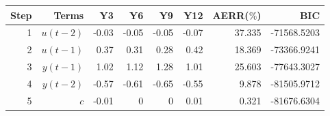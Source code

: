 \begin{tabular}{rrrrrrrr}
Step & Terms & Y3 & Y6 & Y9 & Y12 & AERR($\%$) & BIC \\ 
\hline 
1 & $u(t-2)$ & -0.03 & -0.05 & -0.05 & -0.07 & 37.335 & -71568.5203 \\ 
2 & $u(t-1)$ & 0.37 & 0.31 & 0.28 & 0.42 & 18.369 & -73366.9241 \\ 
3 & $y(t-1)$ & 1.02 & 1.12 & 1.28 & 1.01 & 25.603 & -77643.3027 \\ 
4 & $y(t-2)$ & -0.57 & -0.61 & -0.65 & -0.55 & 9.878 & -81505.9712 \\ 
5 & $c$ & -0.01 & 0 & 0 & 0.01 & 0.321 & -81676.6304 \\ 
\hline 
\end{tabular}